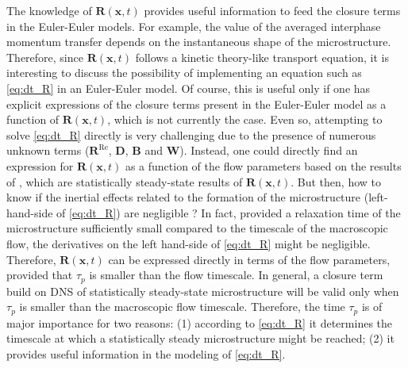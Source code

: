 The knowledge of $\textbf{R}(\textbf{x},t)$ provides useful information to feed the closure terms in the Euler-Euler models.
For example, the value of the averaged interphase momentum transfer depends on the instantaneous shape of the microstructure. 
Therefore, since $\textbf{R}(\textbf{x},t)$ follows a kinetic theory-like transport equation, it is interesting to discuss the possibility of implementing an equation such as \ref{eq:dt_R} in an Euler-Euler model. 
Of course, this is useful only if one has explicit expressions of the closure terms present in the Euler-Euler model as a function of $\textbf{R}(\textbf{x},t)$, which is not currently the case.
Even so, attempting to solve \ref{eq:dt_R} directly is very challenging due to the presence of numerous unknown terms ($\textbf{R}^\text{Re}$, $\textbf{D}$, $\textbf{B}$ and $\textbf{W}$).
Instead, one could directly find an expression for $\textbf{R}(\textbf{x},t)$ as a function of the flow parameters based on the results of \citet{fintzi2024buoyancy}, which are statistically steady-state results of $\textbf{R}(\textbf{x},t)$. 
But then, how to know if the inertial effects related to the formation of the microstructure  (left-hand-side of \ref{eq:dt_R}) are negligible ?
In fact, provided a relaxation time of the microstructure sufficiently small compared to the timescale of the macroscopic flow, the derivatives on the left hand-side of \ref{eq:dt_R} might be negligible.
Therefore, $\textbf{R}(\textbf{x},t)$ can be expressed directly in terms of the flow parameters, provided that $\tau_p$ is smaller than the flow timescale. 
In general, a closure term build on DNS of statistically steady-state microstructure will be valid only when $\tau_p$ is smaller than the macroscopic flow timescale. 
Therefore, the time $\tau_p$ is of major importance for two reasons: 
(1) according to \ref{eq:dt_R} it determines the timescale at which a statistically steady microstructure might be reached; 
(2) it provides useful information in the modeling of \ref{eq:dt_R}.


